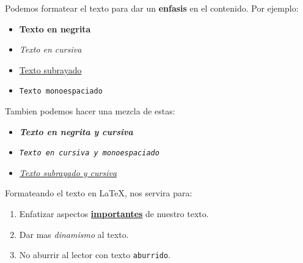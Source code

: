 \documentclass[12pt]{article}
\begin{document}
    \noindent Podemos formatear el texto para dar un \textbf{enfasis} en el
    contenido. Por ejemplo:

    \begin{itemize}
        \item \textbf{Texto en negrita}

        \item \textit{Texto en cursiva}

        \item \underline{Texto subrayado}

        \item \texttt{Texto monoespaciado}
    \end{itemize}

    \noindent Tambien podemos hacer una mezcla de estas:
    \begin{itemize}
        \item \textbf{\textit{Texto en negrita y cursiva}}

        \item \textit{\texttt{Texto en cursiva y monoespaciado}}

        \item \underline{\textit{Texto subrayado y cursiva}}
    \end{itemize}

    \noindent Formateando el texto en \LaTeX, nos servira para:
    \begin{enumerate}
        \item Enfatizar aspectos \textbf{\underline{importantes}} de nuestro texto.

        \item Dar mas \textit{dinamismo} al texto.

        \item No aburrir al lector con texto \texttt{aburrido}.
    \end{enumerate}
\end{document}
